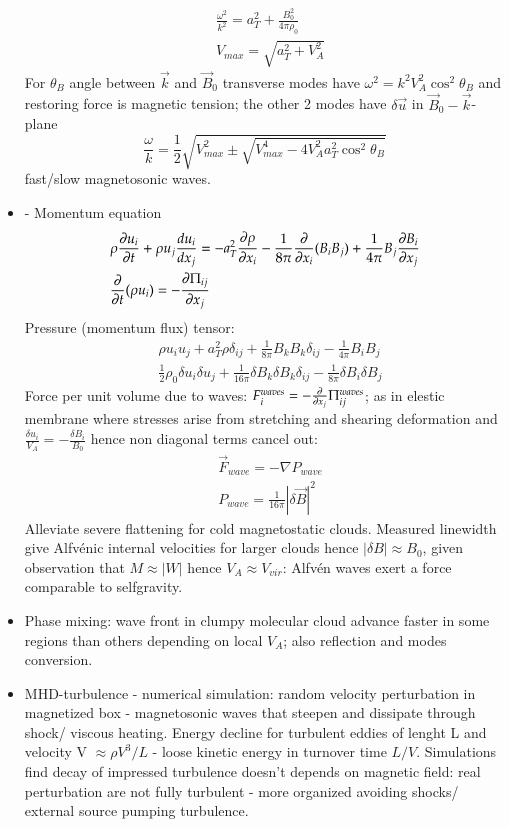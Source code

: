 \documentclass[main.tex]{subfiles}
\begin{document}
\begin{itemize}
\begin{align*}
&\frac{\omega^2}{k^2}=a_T^2+\frac{B_0^2}{4\pi\rho_0}\\
&V_{max}=\sqrt{a_T^2+V_A^2}
\end{align*}
For $\theta_B$ angle between $\vec{k}$ and $\vec{B}_0$ transverse modes have $\omega^2=k^2V_A^2\cos^2{\theta_B}$ and restoring force is magnetic tension; the other 2 modes have $\delta\vec{u}$ in $\vec{B}_0-\vec{k}$-plane
\[\frac{\omega}{k}=\frac{1}{2}\sqrt{V^2_{max}\pm\sqrt{V_{max}^4-4V_A^2a_T^2\cos^2{\theta_B}}}\]
fast/slow magnetosonic waves.
\item {} - Momentum equation
\begin{align*}
&\rho\PDy{t}{u_i}+\rho u_j\TDy{x_j}{u_i}=-a_T^2\PDy{x_i}{\rho}-\frac{1}{8\pi}\PDof{x_i}(B_iB_j)+\frac{1}{4\pi}B_j\PDy{x_j}{B_i}\\
&\PDof{t}(\rho u_i)=-\PDy{x_j}{\Pi_{ij}}
\end{align*}
Pressure (momentum flux) tensor:
\begin{align*}
&\rho u_iu_j+a_T^2\rho\delta_{ij}+\frac{1}{8\pi}B_kB_k\delta_{ij}-\frac{1}{4\pi}B_iB_j\\
&\frac{1}{2}\rho_0\delta u_i\delta u_j+\frac{1}{16\pi}\delta B_k\delta B_k\delta_{ij}-\frac{1}{8\pi}\delta B_i\delta B_j
\end{align*}
Force per unit volume due to waves: $F_i^{waves}=-\PDof{x_j}\Pi_{ij}^{waves}$; as in elestic membrane where stresses arise from  stretching and shearing deformation and $\frac{\delta u_i}{V_A}=-\frac{\delta B_i}{B_0}$ hence non diagonal terms cancel out:
\begin{align*}
&\vec{F}_{wave}=-\nabla P_{wave}\\
&P_{wave}=\frac{1}{16\pi}|\delta\vec{B}|^2
\end{align*}
Alleviate severe flattening for cold magnetostatic clouds. Measured linewidth give Alfv\'enic internal velocities for larger clouds hence $|\delta B|\approx B_0$, given observation that $M\approx|W|$ hence $V_A\approx V_{vir}$: Alfv\'en waves exert a force comparable to selfgravity.
\item Phase mixing: wave front in clumpy molecular cloud advance faster in some regions than others depending on local $V_A$; also reflection and modes conversion.
\item MHD-turbulence - numerical simulation: random velocity perturbation in magnetized box - magnetosonic waves that steepen and dissipate through shock/ viscous heating. Energy decline for turbulent eddies of lenght L and velocity V $\approx\rho V^3/L$ - loose kinetic energy in turnover time $L/V$. Simulations find decay of impressed turbulence doesn't depends on magnetic field: real perturbation are not fully turbulent - more organized avoiding shocks/ external source pumping turbulence.
\end{itemize}
\end{document}
